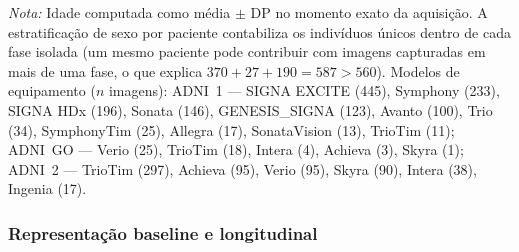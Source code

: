 \documentclass[review]{elsarticle}
\begin{document}
	\begin{table}[H]
		\centering
		\footnotesize
		\caption{Demografia e dados técnicos das imagens T1w MP-RAGE (união sem repetições das quatro coortes de análise, considerando imagens únicas por identificador de aquisição).}
		\label{tab:adni_study}
		\begin{flushleft}
			\footnotesize
			\textit{Nota:} Idade computada como média $\pm$ DP no momento exato da aquisição. A estratificação de sexo por paciente contabiliza os indivíduos únicos dentro de cada fase isolada (um mesmo paciente pode contribuir com imagens capturadas em mais de uma fase, o que explica $370+27+190=587>560$).
			Modelos de equipamento ($n$ imagens): 
			ADNI~1 --- SIGNA EXCITE (445), Symphony (233), SIGNA HDx (196), Sonata (146), GENESIS\_SIGNA (123), Avanto (100), Trio (34), SymphonyTim (25), Allegra (17), SonataVision (13), TrioTim (11); 
			ADNI~GO --- Verio (25), TrioTim (18), Intera (4), Achieva (3), Skyra (1); 
			ADNI~2 --- TrioTim (297), Achieva (95), Verio (95), Skyra (90), Intera (38), Ingenia (17).
		\end{flushleft}
	\end{table}
	
	\subsubsection{Representação baseline e longitudinal}\label{subsubsec:longitudinal}
	
\end{document}
